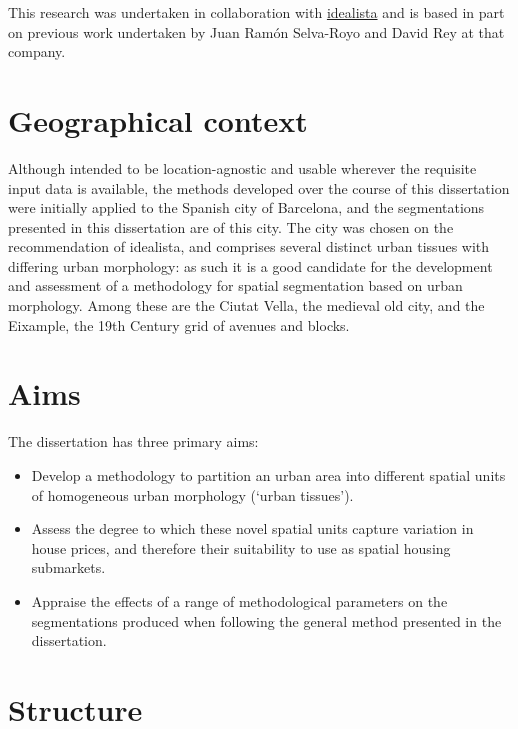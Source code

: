 \documentclass[a4paper, nobind]{templates/ociamthesis}
\begin{document}
This research was undertaken in collaboration with \href{https://www.idealista.com/}{idealista} and is based in part on previous work undertaken by Juan Ramón Selva-Royo and David Rey at that company.

\hypertarget{geographical-context}{%
\section{Geographical context}\label{geographical-context}}

Although intended to be location-agnostic and usable wherever the requisite input data is available, the methods developed over the course of this dissertation were initially applied to the Spanish city of Barcelona, and the segmentations presented in this dissertation are of this city. The city was chosen on the recommendation of idealista, and comprises several distinct urban tissues with differing urban morphology: as such it is a good candidate for the development and assessment of a methodology for spatial segmentation based on urban morphology. Among these are the Ciutat Vella, the medieval old city, and the Eixample, the 19th Century grid of avenues and blocks.

\hypertarget{aims}{%
\section{Aims}\label{aims}}

The dissertation has three primary aims:

\begin{itemize}
\item
  Develop a methodology to partition an urban area into different spatial units of homogeneous urban morphology (`urban tissues').
\item
  Assess the degree to which these novel spatial units capture variation in house prices, and therefore their suitability to use as spatial housing submarkets.
\item
  Appraise the effects of a range of methodological parameters on the segmentations produced when following the general method presented in the dissertation.
\end{itemize}

\hypertarget{structure}{%
\section{Structure}\label{structure}}
\end{document}
